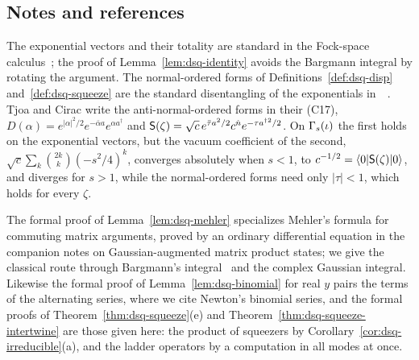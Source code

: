 \begin{veteenv}
\subsection*{Notes and references}

The exponential vectors and their totality are standard in the Fock-space calculus~\cite{parth}; the proof of
Lemma~\ref{lem:dsq-identity} avoids the Bargmann integral by rotating the argument.  The normal-ordered forms of
Definitions~\ref{def:dsq-disp} and~\ref{def:dsq-squeeze} are the standard disentangling of the exponentials
in~\cite[(5)]{tjoacirac}~\cite{perelomov}. Tjoa and Cirac write the anti-normal-ordered forms in their (C17),
$D(\alpha)=e^{\lvert\alpha\rvert^2/2}e^{-\bar\alpha a}e^{\alpha a^\dagger}$ and
$\mathsf S(\zeta)=\sqrt c\,e^{\bar\tau a^2/2}c^{\hat n}e^{-\tau a^{\dagger2}/2}$. On $\Gamma_s(\iota)$ the first holds on the exponential vectors, but the
vacuum coefficient of the second, $\sqrt c\sum_k\binom{2k}k(-s^2/4)^k$, converges absolutely when $s<1$, to
$c^{-1/2}=\langle0\rvert\mathsf S(\zeta)\lvert 0\rangle$, and diverges for $s>1$, while
the normal-ordered forms need only $\lvert\tau\rvert<1$, which holds for every $\zeta$.

 The
formal proof of Lemma~\ref{lem:dsq-mehler} specializes Mehler's formula for commuting matrix arguments, proved by an ordinary
differential equation in the companion notes on Gaussian-augmented matrix product states; we give the classical route through
Bargmann's integral~\cite{bargmann} and the complex Gaussian integral. Likewise the formal proof of
Lemma~\ref{lem:dsq-binomial} for real $y$ pairs the terms of the alternating series, where we cite Newton's binomial series, and
the formal proofs of Theorem~\ref{thm:dsq-squeeze}(e) and Theorem~\ref{thm:dsq-squeeze-intertwine} are those given here: the
product of squeezers by Corollary~\ref{cor:dsq-irreducible}(a), and the ladder operators by a computation in all modes at once.
\end{veteenv}
